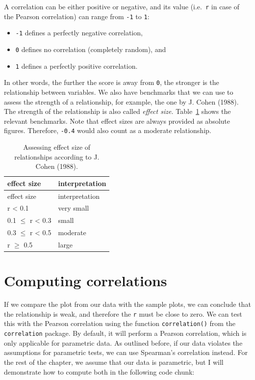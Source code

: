 \documentclass[
  letterpaper,
]{krantz}
\begin{document}
A correlation can be either positive or negative, and its value
(i.e.~\texttt{r} in case of the Pearson correlation) can range from
\texttt{-1} to \texttt{1}:

\begin{itemize}
\item
  \texttt{-1} defines a perfectly negative correlation,
\item
  \texttt{0} defines no correlation (completely random), and
\item
  \texttt{1} defines a perfectly positive correlation.
\end{itemize}

In other words, the further the score is away from \texttt{0}, the
stronger is the relationship between variables. We also have benchmarks
that we can use to assess the strength of a relationship, for example,
the one by J. Cohen (1988). The strength of the relationship is also
called \emph{effect size.} Table~\ref{tbl-effect-size-cohen} shows the
relevant benchmarks. Note that effect sizes are always provided as
absolute figures. Therefore, \texttt{-0.4} would also count as a
moderate relationship.

\begin{longtable}[]{@{}ll@{}}
\caption{Assessing effect size of relationships according to J. Cohen
(1988).}\label{tbl-effect-size-cohen}\tabularnewline
\toprule\noalign{}
effect size & interpretation \\
\midrule\noalign{}
\endfirsthead
\toprule\noalign{}
effect size & interpretation \\
\midrule\noalign{}
\endhead
\bottomrule\noalign{}
\endlastfoot
r \textless{} 0.1 & very small \\
0.1 \(\leq\) r \textless{} 0.3 & small \\
0.3 \(\leq\) r \textless{} 0.5 & moderate \\
r \(\geq\) 0.5 & large \\
\end{longtable}

\section{Computing correlations}\label{sec-computing-correlations}

If we compare the plot from our data with the sample plots, we can
conclude that the relationship is weak, and therefore the \texttt{r}
must be close to zero. We can test this with the Pearson correlation
using the function \texttt{correlation()} from the \texttt{correlation}
package. By default, it will perform a Pearson correlation, which is
only applicable for parametric data. As outlined before, if our data
violates the assumptions for parametric tests, we can use Spearman's
correlation instead. For the rest of the chapter, we assume that our
data is parametric, but I will demonstrate how to compute both in the
following code chunk:
\end{document}
